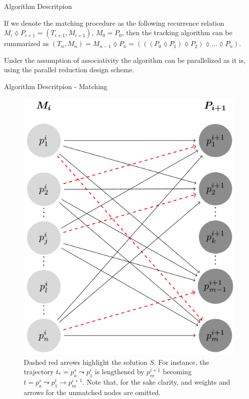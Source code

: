 \documentclass{beamer}
\begin{document}
  \begin{frame}{Algorithm Descritpion}
		
			If we denote the matching procedure as the following recurrence relation $  M_i \lozenge P_{i+1} = (T_{i+1},M_{i+1}) $, $M_0=P_0$, then the  tracking algorithm can be summarized as $(T_n,M_n) = M_{n-1} \lozenge P_{n}=(((P_0 \lozenge P_1)\lozenge P_2) \lozenge \ldots \lozenge P_n)$.

\begin{alertblock}{Under the assumption of associativity}
the algorithm can be parallelized as it is, using the parallel reduction design scheme.

\end{alertblock}


		
\end{frame} %

  \begin{frame}{Algorithm Descritpion - Matching}

\begin{figure}
\centering
	\includegraphics[scale=0.23]{matching}
	\caption{Dashed red arrows highlight the solution $S$. For instance, the trajectory $t_*=p^s_a \leadsto p^i_1$  is lengthened by $p^{i+1}_m$ becoming $t=p^s_a \leadsto p^i_1 \to p^{i+1}_m$.
Note that, for the sake clarity, and weights and arrows for the unmatched   nodes are omitted.}
	\end{figure}	
	
\end{frame} %
\end{document}
